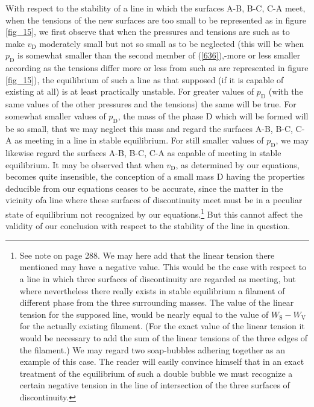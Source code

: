 \documentclass[12pt]{article}
\begin{document}
With respect to the stability of a line in which the surfaces A-B, B-C, C-A meet, when the tensions of the new surfaces are too small to be represented as in figure \ref{fig_15}, we first observe that when the pressures and tensions are such as to make $v_\text{D}$ moderately small but not so small as to be neglected (this will be when $p_\text{D}$ is somewhat smaller than the second member of (\ref{636}),-more or less smaller according as the tensions differ more or less from such as are represented in figure \ref{fig_15}), the equilibrium of such a line as that supposed (if it is capable of existing at all) is at least practically unstable. For greater values of $p_\text{D}$ (with the same values of the other pressures and the tensions) the same will be true.  For somewhat smaller values of $p_\text{D}$, the mass of the phase D which will be formed will be so small, that we may neglect this mass and regard the surfaces A-B, B-C, C-A as meeting in a line in stable equilibrium. For still smaller values of $p_\text{D}$, we may likewise regard the surfaces A-B, B-C, C-A as capable of meeting in stable equilibrium. It may be observed that when $v_\text{D}$, as determined by our equations, becomes quite insensible, the conception of a small mass D having the properties deducible from our equations ceases to be accurate, since the matter in the vicinity ofa line where these surfaces of discontinuity meet must be in a peculiar state of equilibrium not recognized by our equations.\footnote{See note on page 288. We may here add that the linear tension there mentioned may have a negative value. This would be the case with respect to a line in which three surfaces of discontinuity are regarded as meeting, but where nevertheless there really exists in stable equilibrium a filament of different phase from the three surrounding masses. The value of the linear tension for the supposed line, would be nearly equal to the value of $W_\text{S}-W_\text{V}$ for the actually existing filament. (For the exact value of the linear tension it would be necessary to add the sum of the linear tensions of the three edges of the filament.) We may regard two soap-bubbles adhering together as an example of this case. The reader will easily convince himself that in an exact treatment of the equilibrium of such a double bubble we must recognize a certain negative tension in the line of intersection of the three surfaces of discontinuity.} But this cannot affect the validity of our conclusion with respect to the stability of the line in question.
\end{document}
